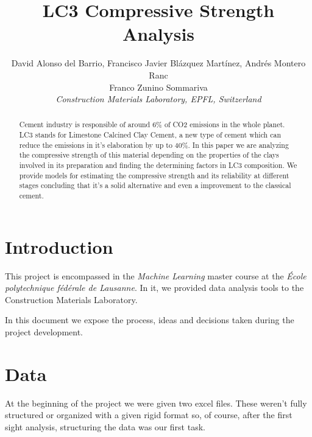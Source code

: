 \documentclass[10pt,conference,compsocconf]{IEEEtran}
\begin{document}
\title{LC3 Compressive Strength Analysis}
\author{
  David Alonso del Barrio, Francisco Javier Blázquez Martínez, Andrés Montero Ranc\\
  Franco Zunino Sommariva \\
  \textit{Construction Materials Laboratory, EPFL, Switzerland}
}

\maketitle

\begin{abstract}
Cement industry is responsible of around 6\% of CO2 emissions in the whole planet. LC3 stands for Limestone Calcined Clay Cement, a new type of cement which can reduce the emissions in it's elaboration by up to 40\%. In this paper we are analyzing the compressive strength of this material depending on the properties of the clays involved in its preparation and finding the determining factors in LC3 composition. We provide models for estimating the compressive strength and its reliability at different stages concluding that it's a solid alternative and even a improvement to the classical cement. %


\end{abstract}

\section{Introduction}

This project is encompassed in the \textit{Machine Learning} master course at the \textit{École polytechnique fédérale de Lausanne}. In it, we provided data analysis tools to the Construction Materials Laboratory.

In this document we expose the process, ideas and decisions taken during the project development.

\section{Data}

At the beginning of the project we were given two excel files. These weren't fully structured or organized with a given rigid format so, of course, after the first sight analysis, structuring the data was our first task.
\end{document}
